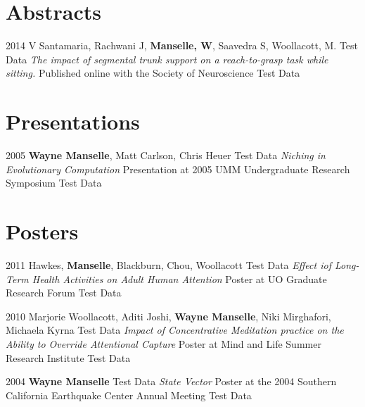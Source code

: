 \documentclass[10pt]{article} %
\begin{document}
\begin{itemize-noindent}

\section{Abstracts}

\job
{2014}
{V Santamaria, Rachwani J, \textbf{Manselle, W}, Saavedra S, Woollacott, M.}
{Test Data}
\textit{The impact of segmental trunk support on a reach-to-grasp task while sitting.}
{Published online with the Society of Neuroscience}
{Test Data}



\section{Presentations}

\job
{2005}
{\textbf{Wayne Manselle}, Matt Carlson, Chris Heuer}
{Test Data}
\textit{Niching in Evolutionary Computation}
{Presentation at 2005 UMM Undergraduate Research Symposium}
{Test Data}



\section{Posters}

\job
{2011}
{Hawkes, \textbf{Manselle}, Blackburn, Chou, Woollacott}
{Test Data}
\textit{Effect iof Long-Term Health Activities on Adult Human Attention}
{Poster at UO Graduate Research Forum}
{Test Data}

\job
{2010}
{Marjorie Woollacott, Aditi Joshi, \textbf{Wayne Manselle}, Niki Mirghafori, Michaela Kyrna}
{Test Data}
\textit{Impact of Concentrative Meditation practice on the Ability to Override Attentional Capture}
{Poster at Mind and Life Summer Research Institute}
{Test Data}

\job
{2004}
{\textbf{Wayne Manselle}}
{Test Data}
\textit{State Vector}
{Poster at the 2004 Southern California Earthquake Center Annual Meeting}
{Test Data}


\end{itemize-noindent}
\end{document}
